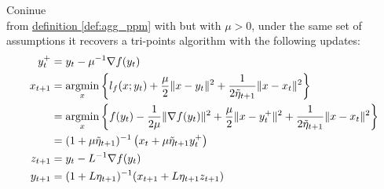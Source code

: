         \begin{proposition}\label{prop:tri_scvx_from_ahn_sra_6.24}
            Coninue \\ 
            from \hyperref[def:agg_ppm]{definition \ref*{def:agg_ppm}} with but with $\mu > 0$, under the same set of assumptions it recovers a tri-points algorithm with the following updates: 
            \begin{align*}
                y_t^+ &= y_t - \mu^{-1}\nabla f(y_t)
                \\
                x_{t + 1} &= \mathop{\rm argmin}\limits_{x} 
                \left\lbrace
                    l_f (x; y_t) + \frac{\mu}{2} \Vert x - y_t\Vert^2 + 
                    \frac{1}{2\tilde \eta_{t + 1}} \Vert x - x_t\Vert^2 
                \right\rbrace
                \\
                &= \mathop{\rm argmin}\limits_{x}
                \left\lbrace
                    f(y_t) - \frac{1}{2\mu} \Vert \nabla f(y_t)\Vert^2 
                    + 
                    \frac{\mu
                    }{2}\Vert x - y_t^+\Vert^2
                    + 
                    \frac{1}{2\tilde \eta_{t + 1}}\Vert x - x_t\Vert^2
                \right\rbrace
                \\
                &= (1 + \mu\tilde \eta_{t + 1})^{-1}
                \left(
                    x_t + \mu \tilde \eta_{t + 1}y_t^{+}
                \right)
                \\
                z_{t + 1} &= y_t - L^{-1} \nabla f(y_t)
                \\
                y_{t + 1} &= (1 + L\eta_{t + 1})^{-1}(x_{t + 1} + L \eta_{t + 1} z_{t + 1})
            \end{align*}
        \end{proposition}
